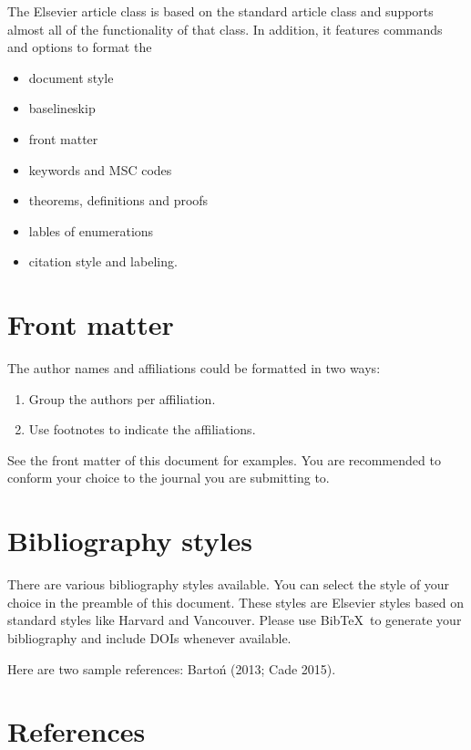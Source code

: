 \documentclass[]{elsarticle} %
\begin{document}
The Elsevier article class is based on the standard article class and
supports almost all of the functionality of that class. In addition, it
features commands and options to format the

\begin{itemize}
\item
  document style
\item
  baselineskip
\item
  front matter
\item
  keywords and MSC codes
\item
  theorems, definitions and proofs
\item
  lables of enumerations
\item
  citation style and labeling.
\end{itemize}

\section{Front matter}\label{front-matter}

The author names and affiliations could be formatted in two ways:

\begin{enumerate}
\def\labelenumi{(\arabic{enumi})}
\item
  Group the authors per affiliation.
\item
  Use footnotes to indicate the affiliations.
\end{enumerate}

See the front matter of this document for examples. You are recommended
to conform your choice to the journal you are submitting to.

\section{Bibliography styles}\label{bibliography-styles}

There are various bibliography styles available. You can select the
style of your choice in the preamble of this document. These styles are
Elsevier styles based on standard styles like Harvard and Vancouver.
Please use BibTeX~to generate your bibliography and include DOIs
whenever available.

Here are two sample references: Bartoń (2013; Cade 2015).

\section*{References}\label{references}
\end{document}
